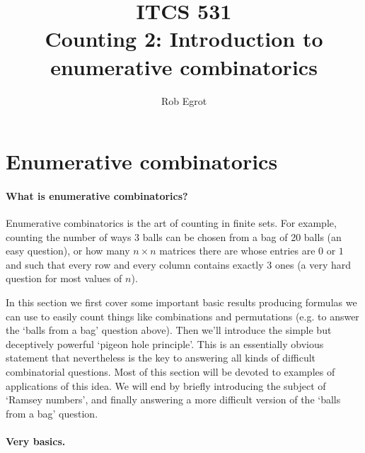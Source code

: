 \documentclass{article}
\title{ITCS 531 \\Counting 2: Introduction to enumerative combinatorics}
\author{Rob Egrot}
\date{}
\theoremstyle{plain}
\begin{document}
\maketitle

\section{Enumerative combinatorics}
\paragraph{What is enumerative combinatorics?}
Enumerative combinatorics is the art of counting in finite sets. For example, counting the number of ways 3 balls can be chosen from a bag of 20 balls (an easy question), or how many $n\times n$ matrices there are whose entries are $0$ or $1$ and such that every row and every column contains exactly 3 ones (a very hard question for most values of $n$). 

In this section we first cover some important basic results producing formulas we can use to easily count things like combinations and permutations (e.g. to answer the `balls from a bag' question above). Then we'll introduce the simple but deceptively powerful `pigeon hole principle'. This is an essentially obvious statement that nevertheless is the key to answering all kinds of difficult combinatorial questions. Most of this section will be devoted to examples of applications of this idea. We will end by briefly introducing the subject of `Ramsey numbers', and finally answering a more difficult version of the `balls from a bag' question.  

\paragraph{Very basics.}
\end{document}
